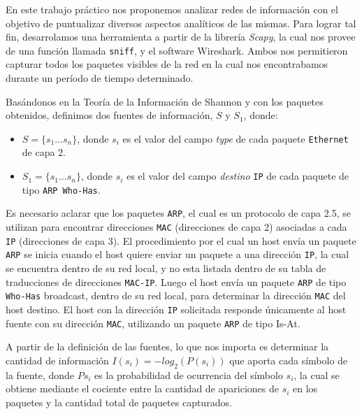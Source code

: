 En este trabajo práctico nos proponemos analizar redes de información con el objetivo de puntualizar diversos aspectos analíticos de las mismas. Para lograr tal fin, desarrolamos una herramienta a partir de la librería \textit{Scapy}, la cual nos provee de una función llamada \texttt{sniff}, y el software Wireshark. Ambos nos permitieron capturar todos los paquetes visibles de la red en la cual nos encontrabamos durante un período de tiempo determinado.

Basándonos en la Teoría de la Información de Shannon y con los paquetes obtenidos, definimos dos fuentes de información, $S$ y $S_{1}$, donde:

\begin{itemize}
  \item $S = \{s_{1} \dots s_{n}\}$, donde $s_{i}$ es el valor del campo \emph{type} de cada paquete \texttt{Ethernet} de capa 2.
  \item $S_{1} = \{s_{1} \dots s_{n}\} $, donde $s_i$ es el valor del campo \emph{destino} \texttt{IP} de cada paquete de
  tipo \texttt{ARP Who-Has}.
\end{itemize}

Es necesario aclarar que los paquetes \texttt{ARP}, el cual es un protocolo de capa 2.5, se utilizan para encontrar direcciones \texttt{MAC} (direcciones de capa 2) asociadas a cada \texttt{IP} (direcciones de capa 3). El procedimiento por el cual un host envía un paquete \texttt{ARP} se inicia cuando el host quiere enviar un paquete a una dirección \texttt{IP}, la cual se encuentra dentro de su red local, y no esta listada dentro de su tabla de traducciones de direcciones \texttt{MAC-IP}. Luego el host envía un paquete \texttt{ARP} de tipo \texttt{Who-Has} broadcast, dentro de su red local, para determinar la dirección \texttt{MAC} del host destino. El host con la dirección \texttt{IP} solicitada responde únicamente al host fuente con su dirección \texttt{MAC}, utilizando un paquete \texttt{ARP} de tipo Is-At.

A partir de la definición de las fuentes, lo que nos importa es determinar la cantidad de información $I(s_{i}) = -log_2(P(s_{i}))$ que aporta cada símbolo de la fuente, donde $Ps_{i}$ es la probabilidad de ocurrencia del símbolo $s_{i}$, la cual se obtiene mediante el cociente entre la cantidad de apariciones de $s_{i}$ en los paquetes y la cantidad total de paquetes capturados.

